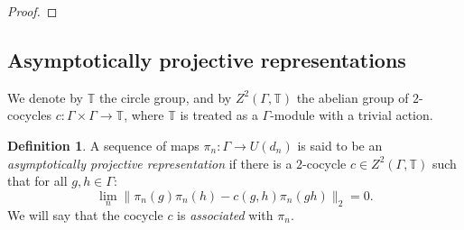 \documentclass[11pt]{amsart}
\DeclareMathOperator{\op}{op}
\newcommand{\T}{{\mathbb{T}}}
\newcommand{\R}{{\mathbb{R}}}
\newcommand{\cH}{{\mathcal{H}}}
\theoremstyle{definition}
\newtheorem{definition}[theorem]{Definition}
\theoremstyle{remark}
\theoremstyle{definition}
\begin{document}
\begin{proof}
\end{proof}

\subsection{Asymptotically projective representations}

We denote by $\T$ the circle group, and by $Z^2(\Gamma, \T)$ the abelian group of $2$-cocycles $c: \Gamma \times \Gamma\to \T$, where $\T$ is treated as a $\Gamma$-module with a trivial action.

\begin{definition}
    \label{def:asym_proj}
    A sequence of maps $\pi_n: \Gamma \to U(d_n)$ is said to be an \emph{asymptotically projective representation} if there is a $2$-cocycle $c \in Z^2(\Gamma, \T)$ such that for all $g,h \in \Gamma$:
    $$\lim_n \| \pi_n(g)\pi_n(h) - c(g,h) \pi_n(gh)\|_2 = 0.$$
    We will say that the cocycle $c$ is \emph{associated} with $\pi_n$.
\end{definition}
\end{document}
